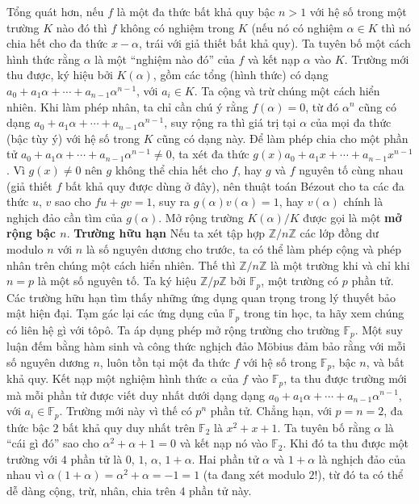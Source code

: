 \begin{multicols}{2}
	Tổng quát hơn, nếu $f$ là một đa thức bất khả quy bậc $n > 1$ với hệ số trong một trường $K$ nào đó thì $f$ không có nghiệm trong $K$ (nếu nó có nghiệm $\alpha \in K$ thì nó chia hết cho đa thức $x - \alpha$, trái với giả thiết bất khả quy). Ta tuyên bố một cách hình thức rằng $\alpha$ là một ``nghiệm nào đó'' của $f$ và kết nạp $\alpha$ vào $K$. Trường mới thu được, ký hiệu bởi $K(\alpha)$, gồm các tổng (hình thức) có dạng $a_0+a_1\alpha+\cdots+a_{n-1}\alpha^{n-1}$, với $a_i \in K$. Ta cộng và trừ chúng một cách hiển nhiên. Khi làm phép nhân, ta chỉ cần chú ý rằng $f(\alpha) = 0$, từ đó $\alpha^n$ cũng có dạng $a_0+a_1\alpha+\cdots+a_{n-1}\alpha^{n-1}$, suy rộng ra thì giá trị tại $\alpha$ của mọi đa thức (bậc tùy ý) với hệ số trong $K$ cũng có dạng này. Để làm phép chia cho một phần tử $a_0+a_1\alpha+\cdots+a_{n-1}\alpha^{n-1} \neq 0$, ta xét đa thức $g(x) a_0+a_1x+\cdots+a_{n-1}x^{n-1}$. Vì $g(x) \neq 0$ nên $g$ không thể chia hết cho $f$, hay $g$ và $f$ nguyên tố cùng nhau (giả thiết $f$ bất khả quy được dùng ở đây), nên thuật toán Bézout cho ta các đa thức $u$, $v$ sao cho $fu+gv=1$, suy ra $g(\alpha)v(\alpha) = 1$, hay $v(\alpha)$ chính là nghịch đảo cần tìm của $g(\alpha)$. Mở rộng trường $K(\alpha)/K$ được gọi là một {\bf\color{duongvaotoanhoc} mở rộng bậc $n$}.
	\vskip 0.1cm
	\textbf{\color{duongvaotoanhoc}Trường hữu hạn}
	\vskip 0.1cm
	Nếu ta xét tập hợp $\mathbb{Z}/n\mathbb{Z}$ các lớp đồng dư modulo $n$ với $n$ là số nguyên dương cho trước, ta có thể làm phép cộng và phép nhân trên chúng một cách hiển nhiên. Thế thì $\mathbb{Z}/n\mathbb{Z}$ là một trường khi và chỉ khi $n = p$ là một số nguyên tố. Ta ký hiệu $\mathbb{Z}/p\mathbb{Z}$ bởi $\mathbb{F}_p$, một trường có $p$ phần tử. Các trường hữu hạn tìm thấy những ứng dụng quan trọng trong lý thuyết bảo mật hiện đại. 
	\vskip 0.1cm
	Tạm gác lại các ứng dụng của $\mathbb{F}_p$ trong tin học, ta hãy xem chúng có liên hệ gì với tôpô. Ta áp dụng phép mở rộng trường cho trường $\mathbb{F}_p$. Một suy luận đếm bằng hàm sinh và công thức nghịch đảo M\"obius đảm bảo rằng với mỗi số nguyên dương $n$, luôn tồn tại một đa thức $f$ với hệ số trong $\mathbb{F}_p$, bậc $n$, và bất khả quy. Kết nạp một nghiệm hình thức $\alpha$ của $f$ vào $\mathbb{F}_p$, ta thu được trường mới mà mỗi phần tử được viết duy nhất dưới dạng dạng $a_0+a_1\alpha+\cdots+a_{n-1}\alpha^{n-1}$, với $a_i \in \mathbb{F}_p$. Trường mới này vì thế có $p^n$ phần tử.
	\vskip 0.1cm
	Chẳng hạn, với $p = n = 2$, đa thức bậc $2$ bất khả quy duy nhất trên $\mathbb{F}_2$ là $x^2+x+1$. Ta tuyên bố rằng $\alpha$ là ``cái gì đó'' sao cho $\alpha^2 + \alpha + 1 = 0$ và kết nạp nó vào $\mathbb{F}_2$. Khi đó ta thu được một trường với $4$ phần tử là $0$, $1$, $\alpha$, $1 + \alpha$. Hai phần tử $\alpha$ và $1 + \alpha$ là nghịch đảo của nhau vì $\alpha(1 + \alpha) = \alpha^2 + \alpha = -1 = 1$ (ta đang xét modulo $2$!), từ đó ta có thể dễ dàng cộng, trừ, nhân, chia trên $4$ phần tử này.

\end{multicols}
